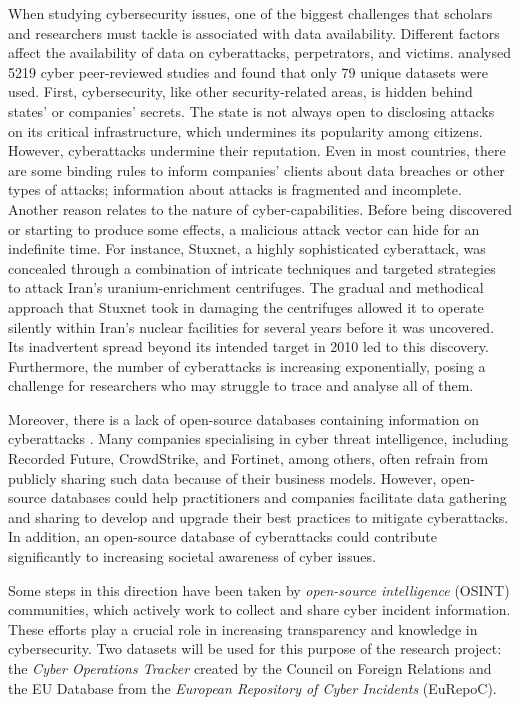 When studying cybersecurity issues, one of the biggest challenges that scholars and researchers must tackle is associated with data availability. Different factors affect the availability of data on cyberattacks, perpetrators, and victims. \textcite{cremer_2022_cyber} analysed 5219 cyber peer-reviewed studies and found that only 79 unique datasets were used. First, cybersecurity, like other security-related areas, is hidden behind states' or companies’ secrets. The state is not always open to disclosing attacks on its critical infrastructure, which undermines its popularity among citizens. However, cyberattacks undermine their reputation. Even in most countries, there are some binding rules to inform companies’ clients about data breaches or other types of attacks; information about attacks is fragmented and incomplete. Another reason relates to the nature of cyber-capabilities. Before being discovered or starting to produce some effects, a malicious attack vector can hide for an indefinite time. For instance, Stuxnet, a highly sophisticated cyberattack, was concealed through a combination of intricate techniques and targeted strategies to attack Iran's uranium-enrichment centrifuges. The gradual and methodical approach that Stuxnet took in damaging the centrifuges allowed it to operate silently within Iran's nuclear facilities for several years before it was uncovered. Its inadvertent spread beyond its intended target in 2010 led to this discovery. 
Furthermore, the number of cyberattacks is increasing exponentially, posing a challenge for researchers who may struggle to trace and analyse all of them. 

Moreover, there is a lack of open-source databases containing information on cyberattacks \autocite{cremer_2022_cyber}. Many companies specialising in cyber threat intelligence, including Recorded Future, CrowdStrike, and Fortinet, among others, often refrain from publicly sharing such data because of their business models. However, open-source databases could help practitioners and companies facilitate data gathering and sharing to develop and upgrade their best practices to mitigate cyberattacks. In addition, an open-source database of cyberattacks could contribute significantly to increasing societal awareness of cyber issues. 

Some steps in this direction have been taken by \textit{open-source intelligence} (OSINT) communities, which actively work to collect and share cyber incident information. These efforts play a crucial role in increasing transparency and knowledge in cybersecurity. 
Two datasets will be used for this purpose of the research project: the \textit{Cyber Operations Tracker} created by the Council on Foreign Relations and the EU Database from the \textit{European Repository of Cyber Incidents} (EuRepoC). 

